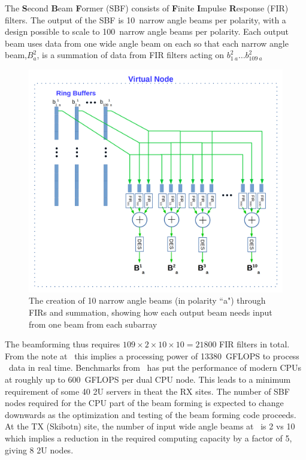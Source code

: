 \documentclass[12pt,a4paper]{article}
\begin{document}
The {\bf S}econd {\bf B}eam {\bf F}ormer (SBF) consists of 
{\bf F}inite {\bf I}mpulse {\bf R}esponse (FIR) filters.
The output of the SBF is 10~narrow angle beams per polarity, with a design possible to scale to 100~narrow angle beams per polarity. 
Each output beam uses data from one wide angle beam on each \fsru so that each narrow angle beam,$B^2_a$, is a summation of data from FIR filters acting on $b^2_{1~a} \ldots b^2_{109~a}$ 
\begin{figure}[!h]
\centering
\includegraphics[width=\textwidth]{E3D_dataflow_2aa.png}
\caption{The creation of 10 narrow angle beams (in polarity ``a") through FIRs and summation, showing how each output beam needs input from one beam from each subarray~\label{fig:beams}}
\end{figure}

The beamforming thus requires $109\times 2\times 10\times 10=21800$ FIR filters in total. From the note at~\cite{assars-note} this implies a processing power of 13380~GFLOPS to process \NBW\ data in real time. 
Benchmarks from~\cite{assars-note} has put the performance of modern CPUs at roughly up to 600~GFLOPS per dual CPU node. 
This leads to a minimum requirement of some 40 2U servers in the\SBF at the RX sites.
The number of SBF nodes required for the CPU part of the beam forming is expected to change downwards as the optimization and testing of the beam forming code proceeds.
At the TX (Skibotn) site, the number of input wide angle beams at \NBW\ is 2 vs 10 which implies a reduction in the required computing capacity by a factor of 5, giving 8 2U nodes.
\end{document}
